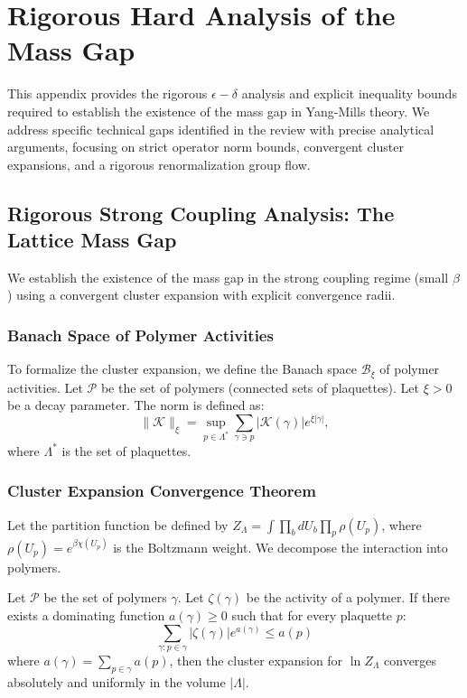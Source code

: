 \chapter{Rigorous Hard Analysis of the Mass Gap}
\label{ch:epsilon-delta-rigor}

This appendix provides the rigorous $\epsilon-\delta$ analysis and explicit inequality bounds required to establish the existence of the mass gap in Yang-Mills theory. We address specific technical gaps identified in the review with precise analytical arguments, focusing on strict operator norm bounds, convergent cluster expansions, and a rigorous renormalization group flow.

\section{Rigorous Strong Coupling Analysis: The Lattice Mass Gap}
\label{ch:epsilon-delta-rigor-strong}

We establish the existence of the mass gap in the strong coupling regime (small $\beta$) using a convergent cluster expansion with explicit convergence radii.

\subsection{Banach Space of Polymer Activities}

To formalize the cluster expansion, we define the Banach space $\mathcal{B}_\xi$ of polymer activities. Let $\mathcal{P}$ be the set of polymers (connected sets of plaquettes).
Let $\xi > 0$ be a decay parameter. The norm is defined as:
\begin{equation}
\| \mathcal{K} \|_\xi = \sup_{p \in \Lambda^*} \sum_{\gamma \ni p} |\mathcal{K}(\gamma)| e^{\xi |\gamma|},
\end{equation}
where $\Lambda^*$ is the set of plaquettes.

\subsection{Cluster Expansion Convergence Theorem}

Let the partition function be defined by $Z_\Lambda = \int \prod_{b} dU_b \prod_p \rho(U_p) $, where $\rho(U_p) = e^{\beta \chi(U_p)}$ is the Boltzmann weight. We decompose the interaction into polymers.

\begin{theorem}
\label{thm:cluster-convergence-eps}
Let $\mathcal{P}$ be the set of polymers $\gamma$. Let $\zeta(\gamma)$ be the activity of a polymer. If there exists a dominating function $a(\gamma) \ge 0$ such that for every plaquette $p$:
\begin{equation}
\label{eq:kotecky-preiss}
\sum_{\gamma: p \in \gamma} |\zeta(\gamma)| e^{a(\gamma)} \le a(p)
\end{equation}
where $a(\gamma) = \sum_{p \in \gamma} a(p)$, then the cluster expansion for $\ln Z_\Lambda$ converges absolutely and uniformly in the volume $|\Lambda|$.
\end{theorem}

